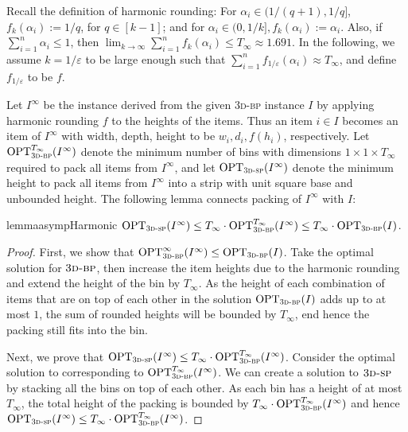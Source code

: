 \documentclass[a4paper,UKenglish,cleveref, autoref, thm-restate]{lipics-v2021}
\newcommand{\eps}{\varepsilon}
\newcommand{\opt}{\mathrm{OPT}}
\newcommand{\tbp}{\textsc{3d-bp}\xspace}
\newcommand{\tsp}{\textsc{3d-sp}\xspace}
\begin{document}
Recall the definition of harmonic rounding: 
For $\alpha_i\in(1/(q+1),1/q]$, $f_k(\alpha_i):=1/q$, for $q \in [k-1]$; and for $\alpha_i \in(0,1/k], f_k(\alpha_i):=\alpha_i$.
Also, if $\sum_{i=1}^n \alpha_i \le 1$,
then $\lim_{k \rightarrow \infty} \sum_{i=1}^n  f_k(\alpha_i) \le T_{\infty} \approx 1.691$. In the following, we assume $k=1/\eps$ to be large enough such that $\sum_{i=1}^n  f_{1/\eps}(\alpha_i)\approx T_{\infty}$, and define $f_{1/\eps}$ to be $f$. 

Let \( I^{\infty} \) be the instance derived from the given \tbp instance \( I \) by applying harmonic rounding $f$ to the heights of the items.
Thus an item $i \in I$ becomes an item of  $I^{\infty}$ with width, depth, height to be $w_i, d_i, f(h_i)$, respectively. 
Let \( \opt_{\tbp}^{T_\infty}(I^{\infty}) \) denote the minimum number of bins with dimensions \( 1 \times 1 \times T_{\infty} \) required to pack all items from \( I^{\infty} \), and let \( \opt_{\tsp}(I^{\infty}) \) denote the minimum height to pack all items from \( I^{\infty} \) into a strip with unit square base and unbounded height. 
The following lemma connects packing of $I^{\infty}$ with $I$:

\begin{restatable}{lemma}{asympHarmonic}
\label{lem:asymp-harmonic}
\( \opt_{\tsp}(I^{\infty}) \leq T_{\infty} \cdot  \opt_{\tbp}^{T_\infty}(I^{\infty}) \leq T_{\infty}\cdot \opt_{\tbp}(I) \).
\end{restatable}

\begin{proof}
First, we show that \( \opt_{\tbp}^\infty(I^{\infty}) \leq \opt_{\tbp}(I) \).
Take the optimal solution for $\tbp$, then increase the item heights due to the harmonic rounding and extend the height of the bin by $T_{\infty}$.
As the height of each combination of items that are on top of each other in the solution $\opt_{\tbp}(I)$ adds up to at most $1$, the sum of rounded heights will be bounded by  $T_{\infty}$, end hence the packing still fits into the bin.

Next, we prove that \( \opt_{\tsp}(I^{\infty}) \leq T_{\infty} \cdot  \opt_{\tbp}^{T_\infty}(I^{\infty}) \).
Consider the optimal solution to corresponding to $\opt_{\tbp}^{T_\infty}(I^{\infty})$.
We can create a solution to $\tsp$ by stacking all the bins on top of each other. 
As each bin has a height of at most $T_{\infty}$, the total height of the packing is bounded by $T_{\infty} \cdot  \opt_{\tbp}^{T_\infty}(I^{\infty})$ and hence
\( \opt_{\tsp}(I^{\infty}) \leq T_{\infty} \cdot  \opt_{\tbp}^{T_\infty}(I^{\infty}) \).
\end{proof}
\end{document}
